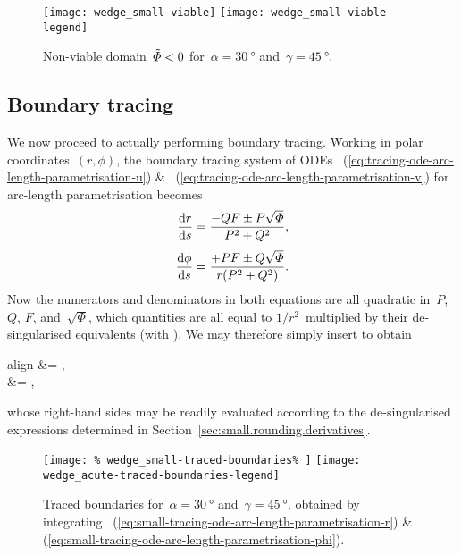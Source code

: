 \begin{figure}
  \newcommand*{\legendoffsetheight}{0.25\textwidth}
  \centering
  \texttt{[image: wedge\_small-viable]}
  \texttt{[image: wedge\_small-viable-legend]}
  \caption{
    Non-viable domain~$\tilde{\varPhi} < 0$
    for~$\alpha = \SI{30}{\degree}$ and~$\gamma = \SI{45}{\degree}$.
  }
  \label{fig:wedge_small-viable}
\end{figure}

\subsection{Boundary tracing}
\label{sec:small.rounding.tracing}

We now proceed to actually performing boundary tracing.
Working in polar coordinates~$(r, \phi)$,
the boundary tracing system of ODEs~%
  (\ref{eq:tracing-ode-arc-length-parametrisation-u})
\&~%
  (\ref{eq:tracing-ode-arc-length-parametrisation-v})
for arc-length parametrisation
becomes
\begin{align*}
  \tder{r}{s} &= \frac{-Q F \pm P \sqrt{\Phi}}{P^2 + Q^2},
    \\[\tallspace]
  \tder{\phi}{s} &= \frac{+P F \pm Q \sqrt{\Phi}}{r \roundbr*{P^2 + Q^2}}.
\end{align*}
Now the numerators and denominators in both equations
are all quadratic in~$P$, $Q$, $F$, and~$\sqrt{\Phi}$,
which quantities are all equal to $1 / r^2$~multiplied by
their de-singularised equivalents (with \desingmarks).
We may therefore simply insert \desingmarks{} to obtain
\begin{important}{align}
   &=
    ,
    \label{eq:small-tracing-ode-arc-length-parametrisation-r}
    \\[\tallspace]
   &=
    ,
    \label{eq:small-tracing-ode-arc-length-parametrisation-phi}
\end{important}
whose right-hand sides may be readily evaluated
according to the de-singularised expressions determined in
Section~\ref{sec:small.rounding.derivatives}.

\begin{figure}
  \newcommand*{\legendoffsetheight}{0.237\textwidth}
  \centering
  \texttt{[image: \%
    wedge\_small-traced-boundaries\%
  ]}
  \texttt{[image: wedge\_acute-traced-boundaries-legend]}
  \caption{
    Traced boundaries for~$\alpha = \SI{30}{\degree}$
    and~$\gamma = \SI{45}{\degree}$,
    obtained by integrating~%
      (\ref{eq:small-tracing-ode-arc-length-parametrisation-r})
    \&~%
      (\ref{eq:small-tracing-ode-arc-length-parametrisation-phi}).
  }
  \label{fig:wedge_small-traced-boundaries}
\end{figure}

